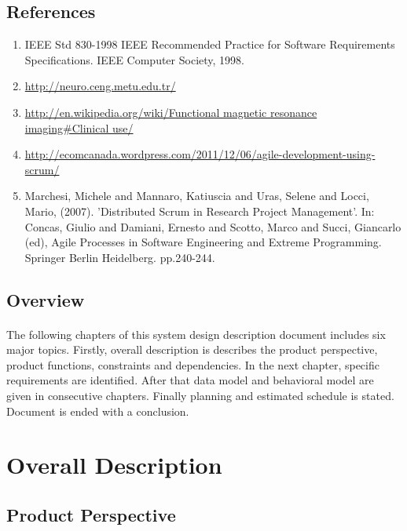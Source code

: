 \documentclass[paper=a4, fontsize=12pt]{scrartcl}	%
\numberwithin{equation}{section}		%
\numberwithin{figure}{section}			%
\numberwithin{table}{section}				%
\newcommand{\skipsubsection}[0]{\vspace{1cm}}
\begin{document}
	\subsection{References}
    	\begin{enumerate}
        \item IEEE Std 830-1998 IEEE Recommended Practice for Software Requirements Specifications. IEEE Computer Society, 1998.
        \item \url{http://neuro.ceng.metu.edu.tr/}
        \item \url{http://en.wikipedia.org/wiki/Functional magnetic resonance imaging#Clinical use/} 
        \item \url{http://ecomcanada.wordpress.com/2011/12/06/agile-development-using-scrum/}
        \item Marchesi, Michele and Mannaro, Katiuscia and Uras, Selene and Locci, Mario, (2007). 'Distributed Scrum in Research Project Management'. In: Concas, Giulio and Damiani, Ernesto and Scotto, Marco and Succi, Giancarlo (ed), Agile Processes in Software Engineering and Extreme Programming. Springer Berlin Heidelberg. pp.240-244. 
         \end{enumerate}
         
    \skipsubsection
    
	\subsection{Overview}
    \paragraph{}
    \normalsize
    The following chapters of this system design description document includes six major topics. Firstly, overall description is describes the product perspective, product functions, constraints and dependencies. In the next chapter, specific requirements are identified. After that data model and behavioral model are given in consecutive chapters. Finally planning and estimated schedule is stated. Document is ended with a conclusion.
    
		
	\newpage
	\section{Overall Description}
            
    \skipsubsection 
        
	\subsection{Product Perspective}
\end{document}
